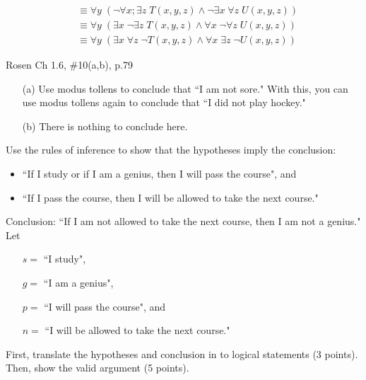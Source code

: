 \documentclass[12pt,addpoints]{exam}
\begin{document}
\begin{questions}
\begin{solution}
\begin{itemize}[itemsep=0pt,parsep=0pt,topsep=0pt,partopsep=0pt]
\begin{align*}
          & \equiv \forall y\; (\neg \forall x; \exists z\; T(x,y,z) \wedge \neg \exists x\; \forall z\; U(x,y,z)) \\
          & \equiv \forall y\; (\exists x\; \neg \exists z\; T(x,y,z) \wedge \forall x\; \neg \forall z\; U(x,y,z)) \\
          & \equiv \forall y\; (\exists x\; \forall z\; \neg T(x,y,z) \wedge \forall x\; \exists z\; \neg U(x,y,z))
        \end{align*}
        \end{itemize}
\end{solution}

\question[6] Rosen Ch 1.6, \#10(a,b), p.79
    \ifprintanswers
        \vspace{-10pt}
    \fi
\begin{solution}
    \begin{itemize}[itemsep=0pt,parsep=0pt,topsep=0pt,partopsep=0pt]
        \item[(a)] Use modus tollens to conclude that ``I am not sore."  With this, you can use modus tollens again to conclude that ``I did not play hockey."
        \item[(b)] There is nothing to conclude here.
    \end{itemize}
\end{solution}


\question[8]\label{probc} Use the rules of inference to show that the hypotheses imply the conclusion:
\begin{itemize}[itemsep=0pt,parsep=0pt,topsep=0pt,partopsep=0pt]
    \item ``If I study or if I am a genius, then I will pass the course", and
    \item ``If I pass the course, then I will be allowed to take the next course."
\end{itemize}
Conclusion: ``If I am not allowed to take the next course, then I am not a genius."
Let
\begin{itemize}[itemsep=0pt,parsep=0pt,topsep=0pt,partopsep=0pt]
    \item[$s = $] ``I study",
    \item[$g = $] ``I am a genius",
    \item[$p = $] ``I will pass the course", and
    \item[$n = $] ``I will be allowed to take the next course."
\end{itemize}
First, translate the hypotheses and conclusion in to logical statements (3 points).  Then, show the valid argument (5 points).


\end{questions}
\end{document}
